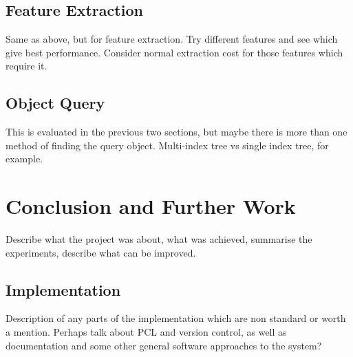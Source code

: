 \documentclass[11pt,a4paper]{kth-mag}
\begin{document}
\section{Feature Extraction}
Same as above, but for feature extraction. Try different features and see which
give best performance. Consider normal extraction cost for those features which
require it.
\section{Object Query}
This is evaluated in the previous two sections, but maybe there is more than one
method of finding the query object. Multi-index tree vs single index tree, for
example.


\chapter{Conclusion and Further Work}
\label{chap:conc}
Describe what the project was about, what was achieved, summarise the
experiments, describe what can be improved.

\begin{appendices}
  \chapter{Implementation}
  \label{chap:impl}
  Description of any parts of the implementation which are non standard or worth a
  mention. Perhaps talk about PCL and version control, as well as documentation
  and some other general software approaches to the system?
\end{appendices}
\printbibliography
\end{document}
